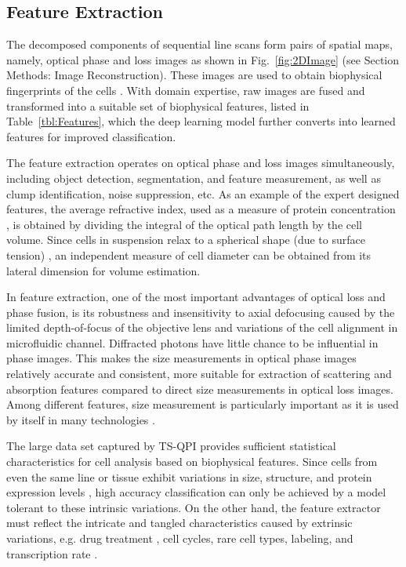 \documentclass[aps,pra,reprint,superscriptaddress]{revtex4-1}
\begin{document}
\subsection*{Feature Extraction}

The decomposed components of sequential line scans form pairs of spatial maps, namely, optical phase and loss images as shown in Fig.~\ref{fig:2DImage} (see Section Methods: Image Reconstruction). These images are used to obtain biophysical fingerprints of the cells \cite{mahjoubfar2013optically, driscoll2012automated}. With domain expertise, raw images are fused and transformed into a suitable set of biophysical features, listed in Table~\ref{tbl:Features}, which the deep learning model further converts into learned features for improved classification. 

The feature extraction operates on optical phase and loss images simultaneously, including object detection, segmentation, and feature measurement, as well as clump identification, noise suppression, etc. As an example of the expert designed features, the average refractive index, used as a measure of protein concentration \cite{barer1953refractometry}, is obtained by dividing the integral of the optical path length by the cell volume. Since cells in suspension relax to a spherical shape (due to surface tension) \cite{revel1974adhesion,whur1977substrate}, an independent measure of cell diameter can be obtained from its lateral dimension for volume estimation. 

In feature extraction, one of the most important advantages of optical loss and phase fusion, is its robustness and insensitivity to axial defocusing \cite{spadinger1990effect} caused by the limited depth-of-focus of the objective lens and variations of the cell alignment in microfluidic channel. Diffracted photons have little chance to be influential in phase images. This makes the size measurements in optical phase images relatively accurate and consistent, more suitable for extraction of scattering and absorption features compared to direct size measurements in optical loss images. Among different features, size measurement is particularly important as it is used by itself in many technologies \cite{adams2008highly, nagrath2007isolation, vona2000isolation, gossett2010label}.  

The large data set captured by TS-QPI provides sufficient statistical characteristics for cell analysis based on biophysical features. Since cells from even the same line or tissue exhibit variations in size, structure, and protein expression levels \cite{kaern2005stochasticity, maheshri2007living, zangle2014live}, high accuracy classification can only be achieved by a model tolerant to these intrinsic variations. On the other hand, the feature extractor must reflect the intricate and tangled characteristics caused by extrinsic variations, e.g. drug treatment \cite{spencer2009non}, cell cycles, rare cell types, labeling, and transcription rate \cite{johnston2012mitochondrial}. 
\end{document}
